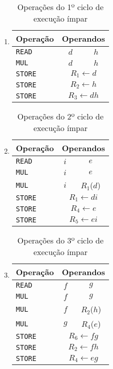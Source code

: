 \begin{enumerate}
\item %

\begin{table}[H]
\centering
\begin{tabular}{l|c|c}
Operação & \multicolumn{2}{c}{Operandos} \\
\hline
\texttt{READ} & $d$ & $h$ \\
\hline
\texttt{MUL} & $d$ & $h$ \\
\hline
\texttt{STORE} & \multicolumn{2}{c}{$R_1\leftarrow d$} \\
\texttt{STORE} & \multicolumn{2}{c}{$R_2\leftarrow h$} \\
\texttt{STORE} & \multicolumn{2}{c}{$R_3\leftarrow dh$} \\
\end{tabular}
\caption{Operações do 1º ciclo de execução ímpar}
\label{tab:odd_1}
\end{table}

\item %

\begin{table}[H]
\centering
\begin{tabular}{l|c|c}
Operação & \multicolumn{2}{c}{Operandos} \\
\hline
\texttt{READ} & $i$ & $e$ \\
\hline
\texttt{MUL} & $i$ & $e$ \\
\texttt{MUL} & $i$ & $R_1$($d$) \\
\hline
\texttt{STORE} & \multicolumn{2}{c}{$R_1\leftarrow di$} \\
\texttt{STORE} & \multicolumn{2}{c}{$R_4\leftarrow e$} \\
\texttt{STORE} & \multicolumn{2}{c}{$R_5\leftarrow ei$} \\
\end{tabular}
\caption{Operações do 2º ciclo de execução ímpar}
\label{tab:odd_2}
\end{table}

\item %

\begin{table}[H]
\centering
\begin{tabular}{l|c|c}
Operação & \multicolumn{2}{c}{Operandos} \\
\hline
\texttt{READ} & $f$ & $g$ \\
\hline
\texttt{MUL} & $f$ & $g$ \\
\texttt{MUL} & $f$ & $R_2$($h$) \\
\texttt{MUL} & $g$ & $R_4$($e$) \\
\hline
\texttt{STORE} & \multicolumn{2}{c}{$R_6\leftarrow fg$} \\
\texttt{STORE} & \multicolumn{2}{c}{$R_2\leftarrow fh$} \\
\texttt{STORE} & \multicolumn{2}{c}{$R_4\leftarrow eg$} \\
\end{tabular}
\caption{Operações do 3º ciclo de execução ímpar}
\label{tab:odd_3}
\end{table}


\end{enumerate}
